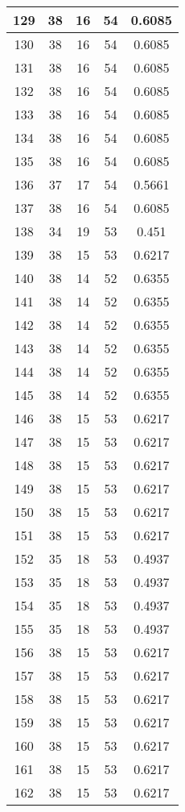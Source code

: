 \documentclass[letterpaper, 12pt]{article}
\begin{document}
\begin{longtable}{|c|c|c|c|c|}
\hline
129 & 38 & 16 & 54 & 0.6085 \\
\hline
130 & 38 & 16 & 54 & 0.6085 \\
\hline
131 & 38 & 16 & 54 & 0.6085 \\
\hline
132 & 38 & 16 & 54 & 0.6085 \\
\hline
133 & 38 & 16 & 54 & 0.6085 \\
\hline
134 & 38 & 16 & 54 & 0.6085 \\
\hline
135 & 38 & 16 & 54 & 0.6085 \\
\hline
136 & 37 & 17 & 54 & 0.5661 \\
\hline
137 & 38 & 16 & 54 & 0.6085 \\
\hline
138 & 34 & 19 & 53 & 0.451 \\
\hline
139 & 38 & 15 & 53 & 0.6217 \\
\hline
140 & 38 & 14 & 52 & 0.6355 \\
\hline
141 & 38 & 14 & 52 & 0.6355 \\
\hline
142 & 38 & 14 & 52 & 0.6355 \\
\hline
143 & 38 & 14 & 52 & 0.6355 \\
\hline
144 & 38 & 14 & 52 & 0.6355 \\
\hline
145 & 38 & 14 & 52 & 0.6355 \\
\hline
146 & 38 & 15 & 53 & 0.6217 \\
\hline
147 & 38 & 15 & 53 & 0.6217 \\
\hline
148 & 38 & 15 & 53 & 0.6217 \\
\hline
149 & 38 & 15 & 53 & 0.6217 \\
\hline
150 & 38 & 15 & 53 & 0.6217 \\
\hline
151 & 38 & 15 & 53 & 0.6217 \\
\hline
152 & 35 & 18 & 53 & 0.4937 \\
\hline
153 & 35 & 18 & 53 & 0.4937 \\
\hline
154 & 35 & 18 & 53 & 0.4937 \\
\hline
155 & 35 & 18 & 53 & 0.4937 \\
\hline
156 & 38 & 15 & 53 & 0.6217 \\
\hline
157 & 38 & 15 & 53 & 0.6217 \\
\hline
158 & 38 & 15 & 53 & 0.6217 \\
\hline
159 & 38 & 15 & 53 & 0.6217 \\
\hline
160 & 38 & 15 & 53 & 0.6217 \\
\hline
161 & 38 & 15 & 53 & 0.6217 \\
\hline
162 & 38 & 15 & 53 & 0.6217 \\

\end{longtable}
\end{document}
